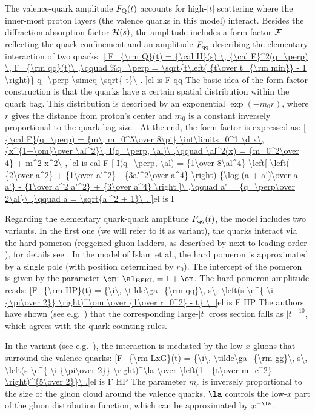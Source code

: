 The valence-quark amplitude $F_{\rm Q}(t)$ accounts for high-$|t|$ scattering where the inner-most proton layers (the valence quarks in this model) interact. Besides the diffraction-absorption factor ${\cal H}(s)$, the amplitude includes a form factor ${\cal F}$ reflecting the quark confinement and an amplitude $F_{\rm qq}$ describing the elementary interaction of two quarks:
\eqref{
	F_{\rm Q}(t) = {\cal H}(s) \, {\cal F}^2(q_\perp) \, F_{\rm qq}(t)\ ,\qquad
	q_\perp \simeq \sqrt{-t}\ .
}{el is F qq}
The basic idea of the form-factor construction is that the quarks have a certain spatial distribution within the quark bag. This distribution is described by an exponential $\exp(- m_0 r)$, where $r$ gives the distance from proton's center and $m_0$ is a constant inversely proportional to the quark-bag size . At the end, the form factor is expressed as:
\eqref{
	{\cal F}(q_\perp) = {m\, m_0^5\over 8\pi} \int\limits_0^1 \d x\, {x^{1+\om}\over \al^2}\, I(q_\perp, \al)\ ,\qquad
	\al^2(x) = {m_0^2\over 4} + m^2 x^2\ ,
}{el is cal F}
\eqref{
	I(q_\perp, \al) = {1\over 8\al^4} \left[
		\left( {2\over a^2} + {1\over a'^2} - {3a'^2\over a^4} \right) {\log (a + a')\over a a'}
		- {1\over a^2 a'^2}
		+ {3\over a^4}
	\right ]\ ,\qquad
	a' = {q_\perp\over 2\al}\ ,\qquad
	a = \sqrt{a'^2 + 1}\ .
}{el is I}

Regarding the elementary quark-quark amplitude $F_{\rm qq}(t)$, the model includes two variants. In the first one (we will refer to it as  variant), the quarks interact via the hard pomeron (reggeized gluon ladders, as described by next-to-leading order ), for details see . In the model of Islam et al., the hard pomeron is approximated by a single pole (with position determined by $r_0$). The intercept of the pomeron is given by the parameter $\om$: $\al_{\rm BFKL} = 1 + \om$. The hard-pomeron amplitude reads:
\eqref{F_{\rm HP}(t) = {\i\, \tilde\ga_{\rm qq}\, s\, \left(s \e^{-\i {\pi\over 2}} \right)^\om \over {1\over r_0^2} - t} \ .}{el is F HP}
The authors have shown (see e.g.~) that the corresponding large-$|t|$ cross section falls as $|t|^{-10}$, which agrees with the  quark counting rules.

In the  variant (see e.g.~), the interaction is mediated by the low-$x$ gluons that surround the valence quarks:
\eqref{F_{\rm LxG}(t) = {\i\, \tilde\ga_{\rm gg}\, s\, \left(s \e^{-\i {\pi\over 2}} \right)^\la \over \left(1 - {t\over m_c^2} \right)^{5\over 2}}\ .}{el is F HP}
The parameter $m_c$ is inversely proportional to the size of the gluon cloud around the valence quarks. $\la$ controls the low-$x$ part of the gluon distribution function, which can be approximated by $x^{-\la}$. 

